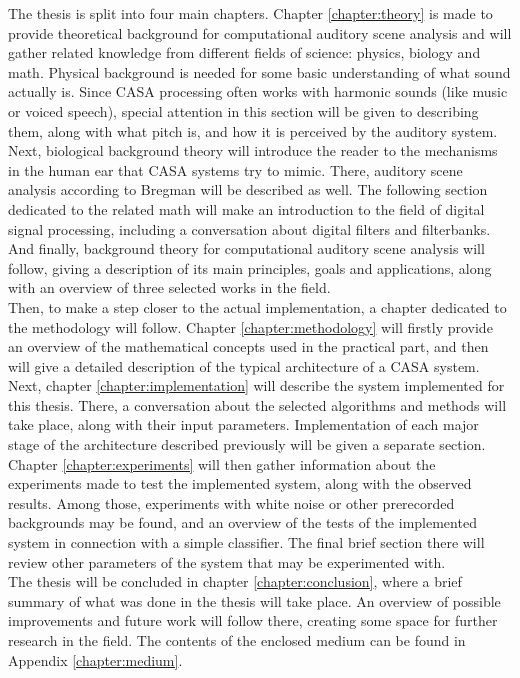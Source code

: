 The thesis is split into four main chapters. Chapter \ref{chapter:theory} is made to provide theoretical background for computational auditory scene analysis and will gather related knowledge from different fields of science: physics, biology and math. Physical background is needed for some basic understanding of what sound actually is. Since CASA processing often works with harmonic sounds (like music or voiced speech), special attention in this section will be given to describing them, along with what pitch is, and how it is perceived by the auditory system. Next, biological background theory will introduce the reader to the mechanisms in the human ear that CASA systems try to mimic. There, auditory scene analysis according to Bregman will be described as well. The following section dedicated to the related math will make an introduction to the field of digital signal processing, including a conversation about digital filters and filterbanks. And finally, background theory for computational auditory scene analysis will follow, giving a description of its main principles, goals and applications, along with an overview of three selected works in the field.\\

Then, to make a step closer to the actual implementation, a chapter dedicated to the metho\-dology will follow. Chapter \ref{chapter:methodology} will firstly provide an overview of the mathematical concepts used in the practical part, and then will give a detailed description of the typical architecture of a CASA system.\\

Next, chapter \ref{chapter:implementation} will describe the system implemented for this thesis. There, a conversation about the selected algorithms and methods will take place, along with their input parameters. Implementation of each major stage of the architecture described previously will be given a separate section.\\

Chapter \ref{chapter:experiments} will then gather information about the experiments made to test the implemented system, along with the observed results. Among those, experiments with white noise or other prerecorded backgrounds may be found, and an overview of the tests of the implemented system in connection with a simple classifier. The final brief section there will review other parameters of the system that may be experimented with.\\

The thesis will be concluded in chapter \ref{chapter:conclusion}, where a brief summary of what was done in the thesis will take place. An overview of possible improvements and future work will follow there, creating some space for further research in the field. The contents of the enclosed medium can be found in Appendix \ref{chapter:medium}.\\
